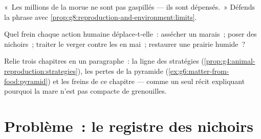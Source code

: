 \begin{exercise}[$\star\star$]\label{exo:g8:reproduction-and-environment:10}
«~Les millions de la morue ne sont pas gaspillés --- ils sont
dépensés.~» Défends la phrase avec
\cref{prop:g8:reproduction-and-environment:limits}.
\end{exercise}

\begin{exercise}[$\star\star$]\label{exo:g8:reproduction-and-environment:11}
Quel frein chaque action humaine déplace-t-elle~: assécher un
marais~; poser des nichoirs~; traiter le verger contre les 
en mai~; restaurer une prairie humide~?
\end{exercise}

\begin{exercise}[$\star\star\star$]\label{exo:g8:reproduction-and-environment:12}
Relie trois chapitres en un paragraphe~: la ligne des stratégies
(\cref{prop:g4:animal-reproduction:strategies}), les pertes de la
pyramide (\cref{ex:g6:matter-from-food:pyramid}) et les freins de ce
chapitre --- comme un seul récit expliquant pourquoi la mare n'est
pas compacte de grenouilles.
\end{exercise}

\section{Problème~: le registre des nichoirs}

